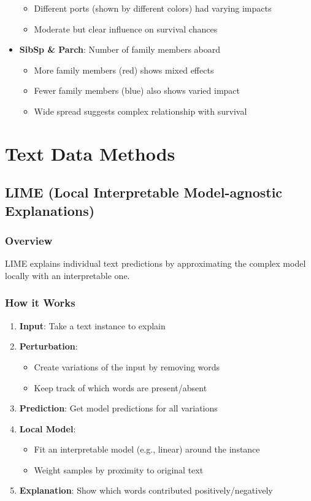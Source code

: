 \documentclass{article}
\begin{document}
\begin{itemize}
        \begin{itemize}
            \item Different ports (shown by different colors) had varying impacts
            \item Moderate but clear influence on survival chances
        \end{itemize}
    \item \textbf{SibSp \& Parch}: Number of family members aboard
        \begin{itemize}
            \item More family members (red) shows mixed effects
            \item Fewer family members (blue) also shows varied impact
            \item Wide spread suggests complex relationship with survival
        \end{itemize}
\end{itemize}

\pagebreak
\section{Text Data Methods}

\subsection{LIME (Local Interpretable Model-agnostic Explanations)}

\subsubsection{Overview}
LIME explains individual text predictions by approximating the complex model locally with an interpretable one.

\subsubsection{How it Works}
\begin{enumerate}
    \item \textbf{Input}: Take a text instance to explain
    \item \textbf{Perturbation}: 
        \begin{itemize}
            \item Create variations of the input by removing words
            \item Keep track of which words are present/absent
        \end{itemize}
    \item \textbf{Prediction}: Get model predictions for all variations
    \item \textbf{Local Model}: 
        \begin{itemize}
            \item Fit an interpretable model (e.g., linear) around the instance
            \item Weight samples by proximity to original text
        \end{itemize}
    \item \textbf{Explanation}: Show which words contributed positively/negatively
\end{enumerate}
\end{document}
